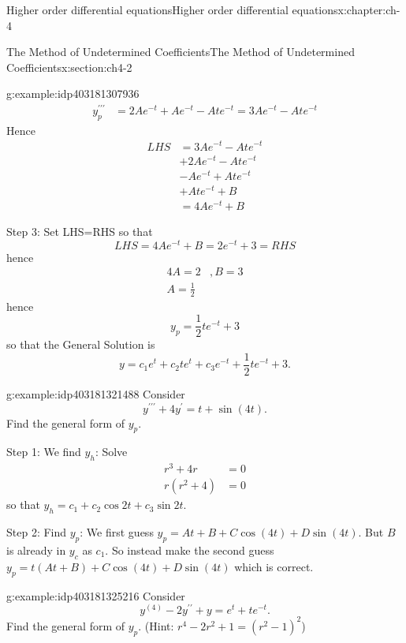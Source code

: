 \documentclass[oneside,10pt,]{book}
\numberwithin{equation}{section}
\numberwithin{equation}{section}
\newcommand{\amp}{&}
\begin{document}
\begin{chapterptx}{Higher order differential equations}{}{Higher order differential equations}{}{}{x:chapter:ch-4}
\begin{sectionptx}{The Method of Undetermined Coefficients}{}{The Method of Undetermined Coefficients}{}{}{x:section:ch4-2}
\begin{example}{}{g:example:idp403181307936}
\begin{align*}
y_{p}^{\prime\prime\prime} \amp =2Ae^{-t}+Ae^{-t}-Ate^{-t}=3Ae^{-t}-Ate^{-t}
\end{align*}
Hence%
\begin{align*}
LHS \amp =3Ae^{-t}-Ate^{-t}\\
\amp +2Ae^{-t}-Ate^{-t}\\
\amp -Ae^{-t}+Ate^{-t}\\
\amp +Ate^{-t}+B\\
\amp =4Ae^{-t}+B
\end{align*}
%
\par
Step 3: Set LHS=RHS so that%
\begin{equation*}
LHS=4Ae^{-t}+B=2e^{-t}+3=RHS
\end{equation*}
hence%
\begin{align*}
4A=2 \amp ,B=3\\
A=\frac{1}{2}
\end{align*}
hence%
\begin{equation*}
y_{p}=\frac{1}{2}te^{-t}+3
\end{equation*}
so that the General Solution is%
\begin{equation*}
y=c_{1}e^{t}+c_{2}te^{t}+c_{3}e^{-t}+\frac{1}{2}te^{-t}+3.
\end{equation*}
%
\end{example}
\begin{example}{}{g:example:idp403181321488}%
Consider%
\begin{equation*}
y^{\prime\prime\prime}+4y^{\prime}=t+\sin(4t).
\end{equation*}
Find the general form of \(y_{p}\).%
\par
Step 1: We find \(y_{h}\): Solve%
\begin{align*}
r^{3}+4r \amp =0\\
r\left(r^{2}+4\right) \amp =0
\end{align*}
so that \(y_{h}=c_{1}+c_{2}\cos2t+c_{3}\sin2t\).%
\par
Step 2: Find \(y_{p}\): We first guess \(y_{p}=At+B+C\cos(4t)+D\sin(4t)\). But \(B\) is already in \(y_{c}\) as \(c_{1}\). So instead make the second guess \(y_{p}=t\left(At+B\right)+C\cos(4t)+D\sin(4t)\) which is correct.%
\end{example}
\begin{example}{}{g:example:idp403181325216}%
Consider%
\begin{equation*}
y^{(4)}-2y^{\prime\prime}+y=e^{t}+te^{-t}.
\end{equation*}
Find the general form of \(y_{p}\). (Hint: \(r^{4}-2r^{2}+1=\left(r^{2}-1\right)^{2}\))%

\end{example}
\end{sectionptx}
\end{chapterptx}
\end{document}
